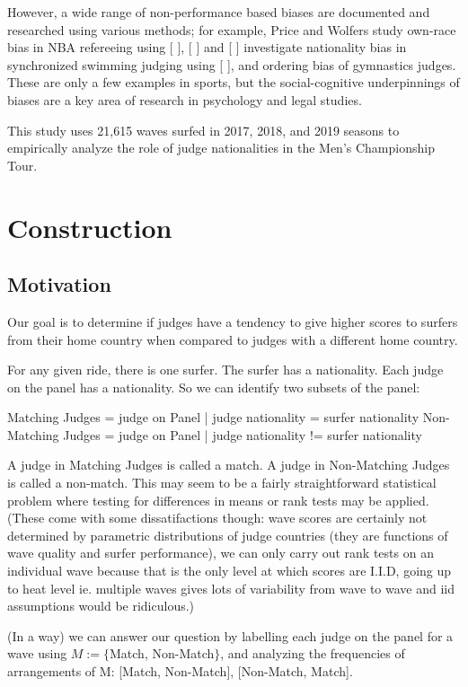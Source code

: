 \documentclass{article}
\theoremstyle{definition}
\begin{document}
However, a wide range of non-performance based biases are documented and researched using various methods; for example, Price and Wolfers study own-race bias in NBA refereeing using [        ], [   ] and [  ] investigate nationality bias in synchronized swimming judging using [       ], and ordering bias of gymnastics judges. These are only a few examples in sports, but the social-cognitive underpinnings of biases are a key area of research in psychology and legal studies.

This study uses 21,615 waves surfed in 2017, 2018, and 2019 seasons to empirically analyze the role of judge nationalities in the Men's Championship Tour.

\section{Construction}
\subsection{Motivation}
Our goal is to determine if judges have a tendency to give higher scores to surfers from their home country when compared to judges with a different home country.

For any given ride, there is one surfer. The surfer has a nationality. Each judge on the panel has a nationality. So we can identify two subsets of the panel:

Matching Judges = {judge on Panel | judge nationality = surfer nationality }
Non-Matching Judges = {judge on Panel | judge nationality != surfer nationality}

A judge in Matching Judges is called a match. A judge in Non-Matching Judges is called a non-match. This may seem to be a fairly straightforward statistical problem where testing for differences in means or rank tests may be applied. (These come with some dissatifactions though: wave scores are certainly not determined by parametric distributions of judge countries (they are functions of wave quality and surfer performance), we can only carry out rank tests on an individual wave because that is the only level at which scores are I.I.D, going up to heat level ie. multiple waves gives lots of variability from wave to wave and iid assumptions would be ridiculous.)

(In a way) we can answer our question by labelling each judge on the panel for a wave using $M :=\{$Match, Non-Match$\}$, and analyzing the frequencies of arrangements of M: [Match, Non-Match], [Non-Match, Match].
\end{document}
